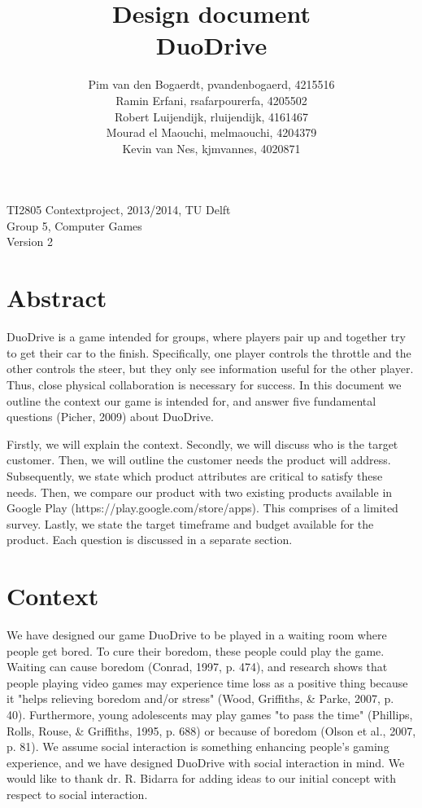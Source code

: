 \documentclass[11pt,twoside,a4paper]{article}
\title{
  Design document\\
  DuoDrive
}
\author{
	Pim van den Bogaerdt, pvandenbogaerd, 4215516\\
	Ramin Erfani, rsafarpourerfa, 4205502\\
	Robert Luijendijk, rluijendijk, 4161467\\
	Mourad el Maouchi, melmaouchi, 4204379\\
	Kevin van Nes, kjmvannes, 4020871
}
\begin{document}
\maketitle
\begin{center}
TI2805 Contextproject, 2013/2014, TU Delft\\
Group 5, Computer Games\\
Version 2
\end{center}
\clearpage

\section*{Abstract}
DuoDrive is a game intended for groups, where players pair up and together try to get their car to the finish. Specifically, one player controls the throttle and the other controls the steer, but they only see information useful for the other player. Thus, close physical collaboration is necessary for success. In this document we outline the context our game is intended for, and answer five fundamental questions (Picher, 2009) about DuoDrive.

Firstly, we will explain the context. Secondly, we will discuss who is the target customer. Then, we will outline the customer needs the product will address. Subsequently, we state which product attributes are critical to satisfy these needs. Then, we compare our product with two existing products available in Google Play (https://play.google.com/store/apps). This comprises of a limited survey. Lastly, we state the target timeframe and budget available for the product. Each question is discussed in a separate section.

\clearpage
\tableofcontents

\clearpage

\section{Context}
We have designed our game DuoDrive to be played in a waiting room where people get bored. To cure their boredom, these people could play the game. Waiting can cause boredom (Conrad, 1997, p. 474), and research shows that people playing video games may experience time loss as a positive thing because it "helps relieving boredom and/or stress" (Wood, Griffiths, \& Parke, 2007, p. 40). Furthermore, young adolescents may play games "to pass the time" (Phillips, Rolls, Rouse, \& Griffiths, 1995, p. 688) or because of boredom (Olson et al., 2007, p. 81). We assume social interaction is something enhancing people's gaming experience, and we have designed DuoDrive with social interaction in mind. We would like to thank dr. R. Bidarra for adding ideas to our initial concept with respect to social interaction.
\end{document}
